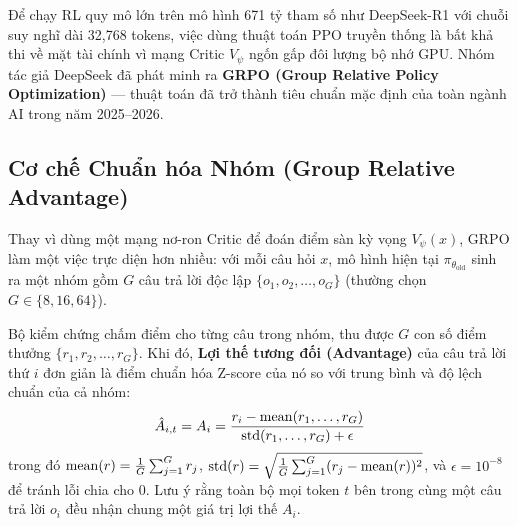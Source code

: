 Để chạy RL quy mô lớn trên mô hình 671 tỷ tham số như DeepSeek-R1 với chuỗi suy nghĩ dài 32,768 tokens, việc dùng thuật toán PPO truyền thống là bất khả thi về mặt tài chính vì mạng Critic $V_\psi$ ngốn gấp đôi lượng bộ nhớ GPU. Nhóm tác giả DeepSeek đã phát minh ra \textbf{GRPO (Group Relative Policy Optimization)} \citep{shao2024deepseekmath} --- thuật toán đã trở thành tiêu chuẩn mặc định của toàn ngành AI trong năm 2025--2026.

\subsection{Cơ chế Chuẩn hóa Nhóm (Group Relative Advantage)}

Thay vì dùng một mạng nơ-ron Critic để đoán điểm sàn kỳ vọng $V_\psi(x)$, GRPO làm một việc trực diện hơn nhiều: với mỗi câu hỏi $x$, mô hình hiện tại $\pi_{\theta_{\text{old}}}$ sinh ra một nhóm gồm $G$ câu trả lời độc lập $\{o_1, o_2, \dots, o_G\}$ (thường chọn $G \in \{8, 16, 64\}$).

Bộ kiểm chứng chấm điểm cho từng câu trong nhóm, thu được $G$ con số điểm thưởng $\{r_1, r_2, \dots, r_G\}$. Khi đó, \textbf{Lợi thế tương đối (Advantage)} của câu trả lời thứ $i$ đơn giản là điểm chuẩn hóa Z-score của nó so với trung bình và độ lệch chuẩn của cả nhóm:
\begin{equation}
  \hat{A}_{i, t} = A_i = \frac{r_i - \operatorname{\mathrm{mean}}(r_1, \dots, r_G)}{\operatorname{\mathrm{std}}(r_1, \dots, r_G) + \epsilon}
  \label{eq:grpo_advantage}
\end{equation}
trong đó $\operatorname{\mathrm{mean}}(r) = \frac{1}{G}\sum_{j=1}^G r_j$, $\operatorname{\mathrm{std}}(r) = \sqrt{\frac{1}{G}\sum_{j=1}^G (r_j - \operatorname{\mathrm{mean}}(r))^2}$, và $\epsilon = 10^{-8}$ để tránh lỗi chia cho $0$. Lưu ý rằng toàn bộ mọi token $t$ bên trong cùng một câu trả lời $o_i$ đều nhận chung một giá trị lợi thế $A_i$.

